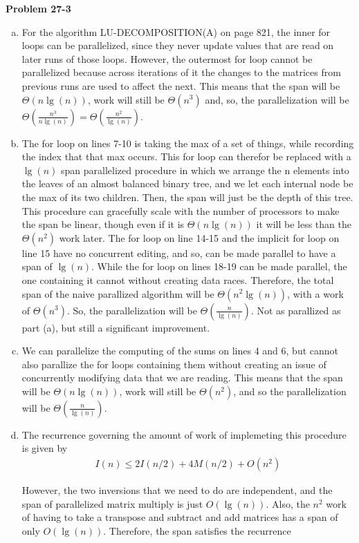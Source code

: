 \documentclass{article}
\begin{document}
\noindent\textbf{Problem 27-3}\\
\begin{enumerate}[a.]
\item For the algorithm LU-DECOMPOSITION(A) on page 821, the inner for loops can be parallelized, since they never update values that are read on later runs of those loops. However, the outermost for loop cannot be parallelized because across iterations of it the changes to the matrices from previous runs are used to affect the next. This means that the span will be $\Theta(n\lg(n))$, work will still be $\Theta(n^3)$ and, so, the parallelization will be $\Theta(\frac{n^3}{n\lg(n)}) = \Theta(\frac{n^2}{\lg(n)})$.
\item
The for loop on lines 7-10 is taking the max of a set of things, while recording the index that that max occurs. This for loop can therefor be replaced with a $\lg(n)$ span parallelized procedure in which we arrange the n elements into the leaves of an almost balanced binary tree, and we let each internal node be the max of its two children. Then, the span will just be the depth of this tree. This procedure can gracefully scale with the number of processors to make the span be linear, though even if it is $\Theta(n\lg(n))$ it will be less than the $\Theta(n^2)$ work later. The for loop on line 14-15 and the implicit for loop on line 15 have no concurrent editing, and so, can be made parallel to have a span of $\lg(n)$. While the for loop on lines 18-19 can be made parallel, the one containing it cannot without creating data races. Therefore, the total span of the naive parallized algorithm will be $\Theta(n^2\lg(n))$, with a work of $\Theta(n^3)$. So, the parallelization will be $\Theta(\frac{n}{\lg(n)})$. Not as parallized as part (a), but still a significant improvement. 
\item
We can parallelize the computing of the sums on lines 4 and 6, but cannot also parallize the for loops containing them without creating an issue of concurrently modifying data that we are reading. This means that the span will be $\Theta(n\lg(n))$, work will still be $\Theta(n^2)$, and so the parallelization will be $\Theta(\frac{n}{\lg(n)})$.
\item
The recurrence governing the amount of work of implemeting this procedure is given by
\begin{align*}
I(n) \le 2 I(n/2) + 4 M(n/2) + O(n^2)
\end{align*}

However, the two inversions that we need to do are independent, and the span of parallelized matrix multiply is just $O(\lg(n))$. Also, the $n^2$ work of having to take a transpose and subtract and add matrices has a span of only $O(\lg(n))$. Therefore, the span satisfies the recurrence


\end{enumerate}
\end{document}
